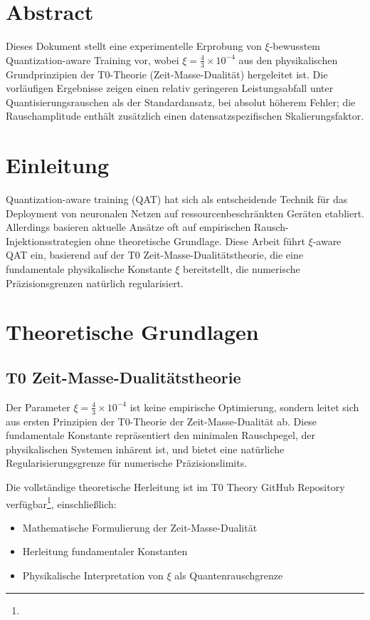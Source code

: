 \section*{Abstract}
		Dieses Dokument stellt eine experimentelle Erprobung von $\xi$-bewusstem Quantization-aware Training vor, wobei $\xi = \frac{4}{3} \times 10^{-4}$ aus den physikalischen Grundprinzipien der T0-Theorie (Zeit-Masse-Dualität) hergeleitet ist. Die vorläufigen Ergebnisse zeigen einen relativ geringeren Leistungsabfall unter Quantisierungsrauschen als der Standardansatz, bei absolut höherem Fehler; die Rauschamplitude enthält zusätzlich einen datensatzspezifischen Skalierungsfaktor.

	
	
	\section{Einleitung}
	
	Quantization-aware training (QAT) hat sich als entscheidende Technik für das Deployment von neuronalen Netzen auf ressourcenbeschränkten Geräten etabliert. Allerdings basieren aktuelle Ansätze oft auf empirischen Rausch-Injektionsstrategien ohne theoretische Grundlage. Diese Arbeit führt $\xi$-aware QAT ein, basierend auf der T0 Zeit-Masse-Dualitätstheorie, die eine fundamentale physikalische Konstante $\xi$ bereitstellt, die numerische Präzisionsgrenzen natürlich regularisiert.
	
	\section{Theoretische Grundlagen}
	
	\subsection{T0 Zeit-Masse-Dualitätstheorie}
	
	Der Parameter $\xi = \frac{4}{3} \times 10^{-4}$ ist keine empirische Optimierung, sondern leitet sich aus ersten Prinzipien der T0-Theorie der Zeit-Masse-Dualität ab. Diese fundamentale Konstante repräsentiert den minimalen Rauschpegel, der physikalischen Systemen inhärent ist, und bietet eine natürliche Regularisierungsgrenze für numerische Präzisionslimits.
	
	Die vollständige theoretische Herleitung ist im T0 Theory GitHub Repository verfügbar\footnote{}, einschließlich:
	\begin{itemize}
		\item Mathematische Formulierung der Zeit-Masse-Dualität
		\item Herleitung fundamentaler Konstanten
		\item Physikalische Interpretation von $\xi$ als Quantenrauschgrenze
	\end{itemize}
	
